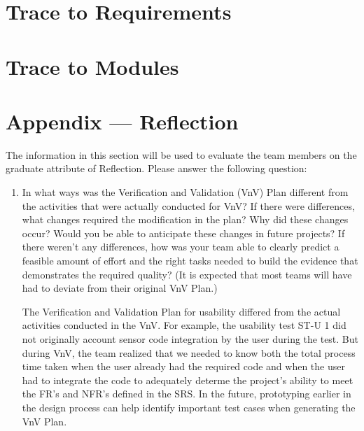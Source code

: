 \documentclass[12pt, titlepage]{article}
\begin{document}
\section{Trace to Requirements}
		
\section{Trace to Modules}		




\newpage{}
\section*{Appendix --- Reflection}

The information in this section will be used to evaluate the team members on the
graduate attribute of Reflection.  Please answer the following question:

\begin{enumerate}
  \item In what ways was the Verification and Validation (VnV) Plan different
  from the activities that were actually conducted for VnV?  If there were
  differences, what changes required the modification in the plan?  Why did
  these changes occur?  Would you be able to anticipate these changes in future
  projects?  If there weren't any differences, how was your team able to clearly
  predict a feasible amount of effort and the right tasks needed to build the
  evidence that demonstrates the required quality?  (It is expected that most
  teams will have had to deviate from their original VnV Plan.)


  The Verification and Validation Plan for usability differed from the actual activities conducted in the VnV. For example, the usability test ST-U 1 did not originally account sensor code integration by the user during the test. But during VnV, the team realized that we needed to know both the total process time taken when the user already had the required code and when the user had to integrate the code to adequately determe the project's ability to meet the FR's and NFR's defined in the SRS. In the future, prototyping earlier in the design process can help identify important test cases when generating the VnV Plan. \\

\end{enumerate}
\end{document}
